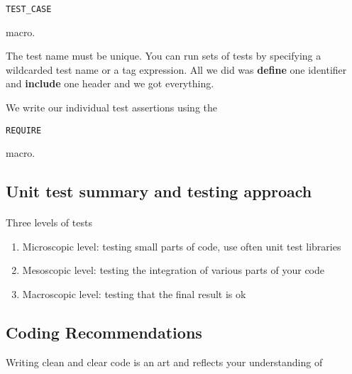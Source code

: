 \begin{verbatim}
TEST_CASE 

\end{verbatim}

macro.

The test name must be unique. You can run sets of tests by specifying a wildcarded test name or a tag expression. 
All we did was \textbf{define} one identifier and \textbf{include} one header and we got everything.

We write our individual test assertions using the 


\begin{verbatim}
REQUIRE 

\end{verbatim}

macro.

\subsection*{Unit test summary and testing approach}

\paragraph{}
Three levels of tests
\begin{enumerate}
\item Microscopic level: testing small parts of code, use often unit test libraries

\item Mesoscopic level: testing the integration of various parts  of your code

\item Macroscopic level: testing that the final result is ok
\end{enumerate}

\noindent

 

\subsection*{Coding Recommendations}
Writing clean and clear code is an art and reflects 
your understanding of 

